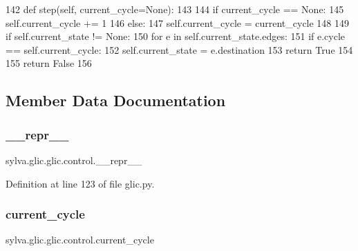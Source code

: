 \begin{DoxyCode}
142     \textcolor{keyword}{def }step(self, current\_cycle=None):
143 
144       \textcolor{keywordflow}{if} current\_cycle == \textcolor{keywordtype}{None}:
145         self.current\_cycle += 1
146       \textcolor{keywordflow}{else}:
147         self.current\_cycle = current\_cycle
148 
149       \textcolor{keywordflow}{if} self.current\_state != \textcolor{keywordtype}{None}:
150         \textcolor{keywordflow}{for} e \textcolor{keywordflow}{in} self.current\_state.edges:
151           \textcolor{keywordflow}{if} e.cycle == self.current\_cycle:
152             self.current\_state = e.destination
153             \textcolor{keywordflow}{return} \textcolor{keyword}{True}
154 
155       \textcolor{keywordflow}{return} \textcolor{keyword}{False}
156 
\end{DoxyCode}


\subsection{Member Data Documentation}
\mbox{\label{classsylva_1_1glic_1_1glic_1_1control_ac4ec61e55ba16dd0abcd97a493be8f0d}} 
\subsubsection{\texorpdfstring{\+\_\+\+\_\+repr\+\_\+\+\_\+}{\_\_repr\_\_}}
{\footnotesize\ttfamily sylva.\+glic.\+glic.\+control.\+\_\+\+\_\+repr\+\_\+\+\_\+\hspace{0.3cm}{\ttfamily [private]}}



Definition at line 123 of file glic.\+py.

\mbox{\label{classsylva_1_1glic_1_1glic_1_1control_a1e5f2d48e2bfafe60f1891e0dcb1d98a}} 
\subsubsection{\texorpdfstring{current\+\_\+cycle}{current\_cycle}}
{\footnotesize\ttfamily sylva.\+glic.\+glic.\+control.\+current\+\_\+cycle}



